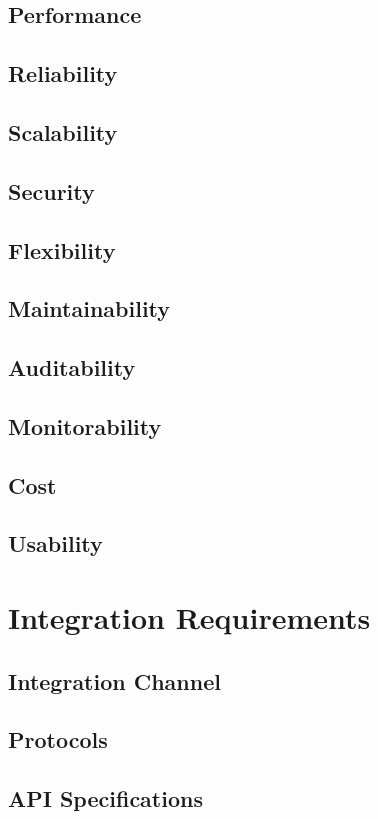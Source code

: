 \documentclass[a4paper]{article}
\begin{document}
\subsection{Performance}
\subsection{Reliability}
\subsection{Scalability}
\subsection{Security}
\subsection{Flexibility}
\subsection{Maintainability}
\subsection{Auditability}
\subsection{Monitorability}
\subsection{Cost}
\subsection{Usability}

\section{Integration Requirements}
\subsection{Integration Channel}
\subsection{Protocols}
\subsection{API Specifications}
\end{document}
